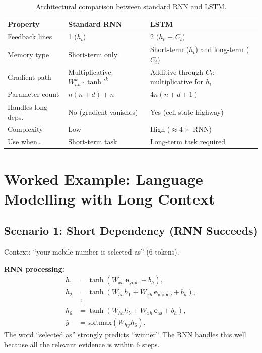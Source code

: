 \documentclass[12pt,a4paper]{article}
\begin{document}
\begin{table}[ht]
  \centering
  \caption{Architectural comparison between standard RNN and LSTM.}
  \label{tab:rnn-lstm-arch}
  \begin{tabularx}{\linewidth}{@{}lXX@{}}
    \toprule
    \textbf{Property}
      & \textbf{Standard RNN}
      & \textbf{LSTM} \\
    \midrule
    Feedback lines
      & 1 ($h_t$)
      & 2 ($h_t$ + $C_t$) \\
    Memory type
      & Short-term only
      & Short-term ($h_t$) and long-term ($C_t$) \\
    Gradient path
      & Multiplicative: $W_{hh}^k \cdot \tanh'^k$
      & Additive through $C_t$; multiplicative for $h_t$ \\
    Parameter count
      & $n(n+d)+n$
      & $4n(n+d+1)$ \\
    Handles long deps.\
      & No (gradient vanishes)
      & Yes (cell-state highway) \\
    Complexity
      & Low
      & High ($\approx 4\times$ RNN) \\
    Use when\ldots
      & Short-term task
      & Long-term task required \\
    \bottomrule
  \end{tabularx}
\end{table}

\section{Worked Example: Language Modelling with Long Context}
\label{sec:worked-example}

\subsection{Scenario 1: Short Dependency (RNN Succeeds)}
\label{subsec:scenario1}

\begin{example}[title=``Your mobile number is selected as \underline{\hspace{1.5em}}'']
  Context: ``your mobile number is selected as'' (6 tokens). \medskip

  \noindent\textbf{RNN processing:}
  \begin{align*}
    h_1 &= \tanh(W_{xh}\,\mathbf{e}_{\text{your}} + b_h), \\
    h_2 &= \tanh(W_{hh}h_1 + W_{xh}\,\mathbf{e}_{\text{mobile}} + b_h), \\
        &\;\vdots \\
    h_6 &= \tanh(W_{hh}h_5 + W_{xh}\,\mathbf{e}_{\text{as}} + b_h), \\
    \hat{y} &= \text{softmax}(W_{hy}h_6).
  \end{align*}
  The word ``selected as'' strongly predicts ``winner''. The RNN handles
  this well because all the relevant evidence is within 6 steps.
\end{example}
\end{document}
